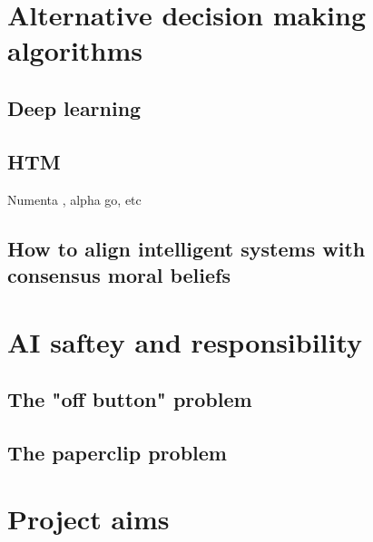\section{Alternative decision making algorithms}
\subsection{Deep learning}
\subsection{HTM}
Numenta \cite{numentahome}, alpha go, etc
\subsection{How to align intelligent systems with consensus moral beliefs}

\section{AI saftey and responsibility}
\subsection{The "off button" problem}
\subsection{The paperclip problem}

\section{Project aims}
